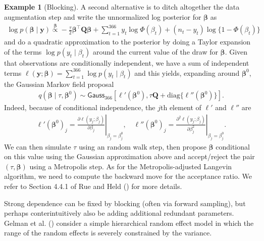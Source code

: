 \documentclass[
  11pt,
  letterpaper,
]{scrbook}
\theoremstyle{definition}
\newtheorem{example}{Example}[chapter]
\theoremstyle{plain}
\theoremstyle{plain}
\theoremstyle{plain}
\theoremstyle{definition}
\theoremstyle{definition}
\theoremstyle{plain}
\theoremstyle{plain}
\theoremstyle{remark}
\begin{document}
\begin{example}[Blocking]
A second alternative is to ditch altogether the data augmentation step
and write the unnormalized log posterior for \(\boldsymbol{\beta}\) as
\begin{align*}
 \log p(\boldsymbol{\beta} \mid \boldsymbol{y}) \stackrel{\boldsymbol{\beta}}{\propto} - \frac{\tau}{2} \boldsymbol{\beta}^\top \mathbf{Q} \boldsymbol{\beta} + \sum_{t=1}^{366} y_{t} \log \Phi(\beta_t) + (n_t-y_{t}) \log\{1-\Phi(\beta_t)\}
\end{align*} and do a quadratic approximation to the posterior by doing
a Taylor expansion of the terms \(\log p(y_{t} \mid \beta_{t})\) around
the current value of the draw for \(\boldsymbol{\beta}.\) Given that
observations are conditionally independent, we have a sum of independent
terms
\(\ell(\boldsymbol{y}; \boldsymbol{\beta}) = \sum_{t=1}^{366}\log p(y_t \mid \beta_t)\)
and this yields, expanding around \(\boldsymbol{\beta}^0\), the Gaussian
Markov field proposal \begin{align*}
q(\boldsymbol{\beta} \mid \tau, \boldsymbol{\beta}^0)  \sim \mathsf{Gauss}_{366}\left[\ell'(\boldsymbol{\beta}^0), \tau\mathbf{Q} + \mathrm{diag}\{\ell''(\boldsymbol{\beta}^0)\}\right].
\end{align*} Indeed, because of conditional independence, the \(j\)th
element of \(\ell'\) and \(\ell''\) are \begin{align*}
\ell'(\boldsymbol{\beta}^0)_j  = \left. \frac{\partial \ell(y_j; \beta_j)}{\partial \beta_j}\right|_{\beta_j = \beta_j^0}, \quad \ell''(\boldsymbol{\beta}^0)_j  = \left. \frac{\partial^2 \ell(y_j; \beta_j)}{\partial \beta_j^2}\right|_{\beta_j = \beta_j^0}.
\end{align*} We can then simulate \(\tau\) using an random walk step,
then propose \(\boldsymbol{\beta}\) conditional on this value using the
Gaussian approximation above and accept/reject the pair
\((\tau, \boldsymbol{\beta})\) using a Metropolis step. As for the
Metropolis-adjusted Langevin algorithm, we need to compute the backward
move for the acceptance ratio. We refer to Section 4.4.1 of Rue and Held
() for more details.

\end{example}

Strong dependence can be fixed by blocking (often via forward sampling),
but perhaps conterintuitively also be adding additional redundant
parameters. Gelman et al. () consider a
simple hierarchical random effect model in which the range of the random
effects is severely constrained by the variance.
\end{document}
